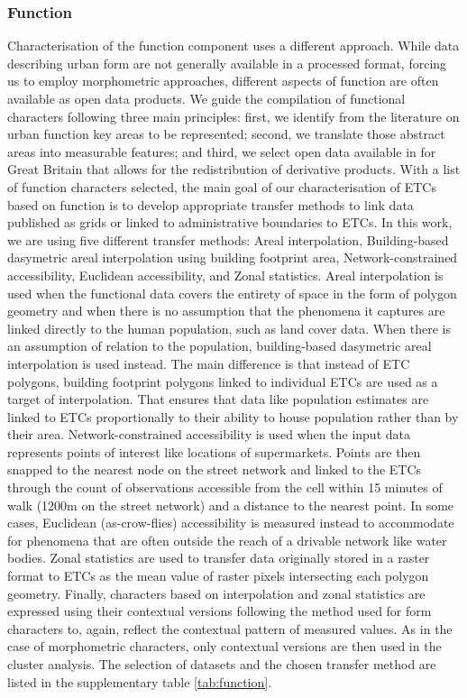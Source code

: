 \documentclass[fleqn,10pt]{wlscirep}
\begin{document}
\subsubsection*{Function}
Characterisation of the function component uses a different approach. While data
describing urban form are not generally available in a processed format, forcing us to employ morphometric approaches, different aspects of function are often available as
open data products.
We guide the compilation of functional characters following three main
principles: first, we identify from the literature on urban function key areas
to be represented; second, we translate those abstract areas into measurable
features; and third, we select open data available in for Great Britain that
allows for the redistribution of derivative products.
With a list of function characters selected, the main goal of our characterisation of ETCs based on
function is to develop appropriate transfer methods to link data published as grids or
linked to administrative boundaries to ETCs.
In this work, we are using five different transfer methods: Areal interpolation,
Building-based dasymetric areal interpolation\cite{eli_knaap_2021_5047613} using building footprint area, Network-constrained accessibility,
Euclidean accessibility, and Zonal statistics. Areal interpolation is used when the
functional data covers the entirety of space in the
form of polygon geometry and when there is no assumption that the phenomena it captures
are linked directly to the human population, such as land cover data. When there is
an assumption of relation to the population, building-based dasymetric areal
interpolation is used instead. The main difference is that instead of ETC polygons,
building footprint polygons linked to individual ETCs are used as a target of
interpolation. That ensures that data like population estimates are linked to ETCs
proportionally to their ability to house population rather than by their area.
Network-constrained accessibility is used when the input data represents points of
interest like locations of supermarkets. Points are then snapped to the nearest node on
the street network and linked to the ETCs through the count of observations
accessible from the cell within 15 minutes of walk (1200m on the street network) and a distance to the nearest point. In
some cases, Euclidean (as-crow-flies) accessibility is measured instead to accommodate
for phenomena that are often outside the reach of a drivable network like water bodies.
Zonal statistics are used to transfer data originally stored in a raster
format to ETCs as the mean value of raster pixels intersecting each polygon
geometry. Finally, characters based on interpolation and zonal statistics are expressed
using their contextual versions following the method used for form characters to, again,
reflect the contextual pattern of measured values. As in the case of morphometric characters,
only contextual versions are then used in the cluster analysis. The selection of datasets and the chosen
transfer method are listed in the supplementary table \ref{tab:function}.
\end{document}
